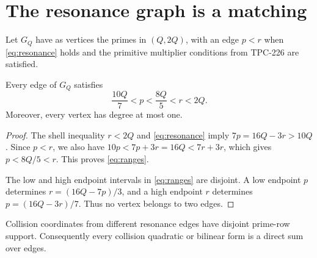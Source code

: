 \section{The resonance graph is a matching}

Let $G_Q$ have as vertices the primes in $(Q,2Q)$, with an edge $p<r$ when
\eqref{eq:resonance} holds and the primitive multiplier conditions from TPC-226 are
satisfied.

\begin{theorem}
\label{thm:matching}
Every edge of $G_Q$ satisfies
\begin{equation}
 \frac{10Q}{7}<p<\frac{8Q}{5}<r<2Q.
 \label{eq:ranges}
\end{equation}
Moreover, every vertex has degree at most one.
\end{theorem}

\begin{proof}
The shell inequality $r<2Q$ and \eqref{eq:resonance} imply
$7p=16Q-3r>10Q$.  Since $p<r$, we also have
$10p<7p+3r=16Q<7r+3r$, which gives $p<8Q/5<r$.  This proves
\eqref{eq:ranges}.

The low and high endpoint intervals in \eqref{eq:ranges} are disjoint.  A low endpoint
$p$ determines $r=(16Q-7p)/3$, and a high endpoint $r$ determines
$p=(16Q-3r)/7$.  Thus no vertex belongs to two edges.
\end{proof}

\begin{corollary}
Collision coordinates from different resonance edges have disjoint prime-row support.
Consequently every collision quadratic or bilinear form is a direct sum over edges.
\end{corollary}
